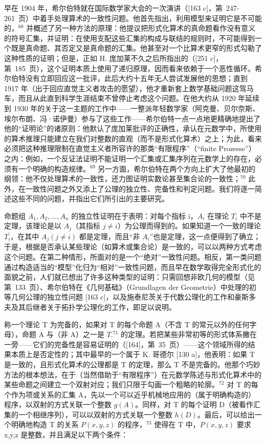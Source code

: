 早在 1904 年，希尔伯特就在国际数学家大会的一次演讲（{[}163 c{]}，第~247-261~页）中着手处理算术的一致性问题。他首先指出，利用模型来证明它是不可能的，\(^{68}\) 并概述了另一种方法的原理：他提议把形式化算术的真命题看作没有意义的符号汇集，并证明：在使用支配这些汇集的构成与联结的规则时，不可能得到一个既是真命题、其否定又是真命题的汇集。他甚至对一个比算术更窄的形式勾勒了这种性质的证明；但是，正如 H. 庞加莱不久之后所指出的（{[}251 c{]}，第~185~页），这个证明本质上使用了递归原理，因而看来依赖于一个恶性循环。希尔伯特没有立即回应这一批评，此后大约十五年无人尝试发展他的思想；直到 1917 年（出于回应直觉主义者攻击的愿望），他才重新套上数学基础问题这驾马车，而且从此直到科学生涯结束不曾停止考虑这个问题。在他大约从 1920 年延续到 1930 年的关于这一主题的工作中——一整派年轻数学家（阿克曼、贝尔奈斯、埃尔布朗、冯·诺伊曼）参与了这些工作——希尔伯特一点一点地更精确地提出了他的“证明论”的诸原则：他默认了庞加莱批评的正确性，承认在元数学中，所使用的算术推理只能建立在我们对整数的直观（而不是形式化算术）之上；为此，看来必须把这种推理限制在直觉主义者所容许的那类“有限程序”（“finite Prozesse”）之内：例如，一个反证法证明不能证明一个汇集或汇集序列在元数学上的存在，必须有一个明确的构造规律。\(^{69}\) 另一方面，希尔伯特在两个方向上扩大了他最初的纲领：他不仅处理算术的一致性，还力图证明实数论甚至集合论的一致性；\(^{70}\) 此外，在一致性问题之外又添上了公理的独立性、完备性和判定问题。我们将逐一简述这些不同的问题，并指出它们所引出的主要研究。

命题组 \(A_{1}, A_{2}, \ldots, A_{n}\) 的独立性证明在于表明：对每个指标 i，\(A_{i}\) 在理论 \(T_{i}\) 中不是定理，该理论是以 \(A_{j}\)（其指标 \(j \neq i\)）为公理而得到的。如果知道一个一致的理论 \(T_{i}^{\prime}\)，在其中 \(A_{j}(j \neq i)\) 都是定理，而且“非 \(A_{i}\)”也是定理，这一点便得到了确立；于是，根据是否承认某些理论（如算术或集合论）是一致的，可以以两种方式考虑这个问题。在第二种情形，所面对的是一个“绝对”一致性问题。相反，第一类问题通过构造适当的“模型”化归为“相对”一致性问题，而且早在数学取得完全形式化的面貌之前，人们就已想出了许多这种类型的证明：只需回想非欧几何的模型（见第~133~页）、希尔伯特在《几何基础》（Grundlagen der Geometrie）中处理的初等几何公理的独立性问题 {[}163 c{]}，以及施泰尼茨关于代数公理化的工作和豪斯多夫及其后继者关于拓扑学公理化的工作，即足以说明。

称一个理论 T 为完备的，如果对 T 的每个命题 A（不含 T 的常元以外的任何字母），命题 A 与（非 A）之一是 \(T.^{71}\) 的定理。若把某些非常初等的形式体系撇在一旁——它们的完备性是容易证明的（{[}164{]}，第~35~页）——这个领域所得的结果本质上是否定性的；其中最早的一个属于 K. 哥德尔 {[}130 a{]}，他表明：如果 T 是一致的，且形式化算术的公理都是 T 的定理，那么 T 不是完备的。他那个巧妙方法的根本想法，在于（当然借助于“有限程序”）在元数学陈述与形式化算术中的某些命题之间建立一个双射对应；我们只限于勾画一个粗略的轮廓。\(^{72}\) 对 T 的每个作为项或关系的汇集 A，先以一个可以近乎机械地应用的（属于明确构造的）程序，以双射的方式关联一个整数 \(g(A)\)。同样，对 T 的每个证明 D（被看作汇集的一个相继序列），可以以双射的方式关联一个整数 \(h(D)\)。最后，可以给出一个明确地构造 T 的关系 \(P(x,y,z)\) 的程序，\(^{73}\) 使得在 T 中，\(P(x,y,z)\) 要求 x,y,z 是整数，并且满足以下两个条件：

